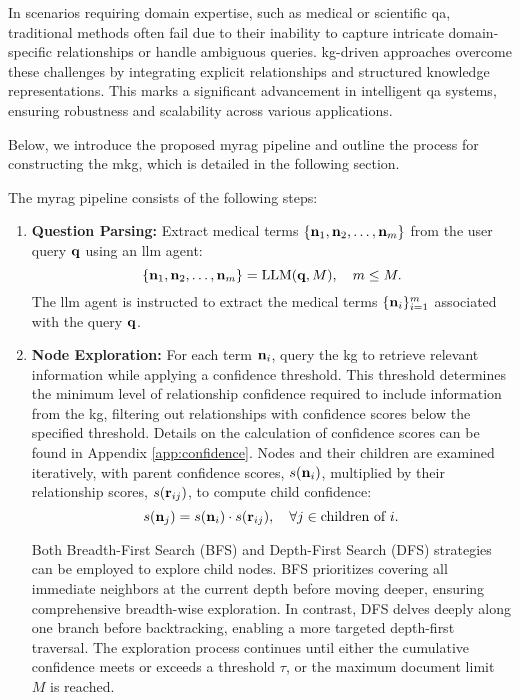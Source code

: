 In scenarios requiring domain expertise, such as medical or scientific \gls{qa}, traditional methods often fail due to their inability to capture intricate domain-specific relationships or handle ambiguous queries. \gls{kg}-driven approaches overcome these challenges by integrating explicit relationships and structured knowledge representations. This marks a significant advancement in intelligent \gls{qa} systems, ensuring robustness and scalability across various applications.


Below, we introduce the proposed \gls{myrag} pipeline and outline the process for constructing the \gls{mkg}, which is detailed in the following section.

The \gls{myrag} pipeline consists of the following steps:
\begin{enumerate}
    \item \textbf{Question Parsing:} Extract medical terms $\{{\mathbf{n}}_1, {\mathbf{n}}_2, \ldots, {\mathbf{n}}_m\}$ from the user query ${\mathbf{q}}$ using an \gls{llm} agent:
    \[
    \{{\mathbf{n}}_1, {\mathbf{n}}_2, \ldots, {\mathbf{n}}_m\} = \text{LLM}({\mathbf{q}}, M), \quad m \leq M.
    \]
    The \gls{llm} agent is instructed to extract the medical terms $\{{\mathbf{n}}_i\}_{i=1}^m$ associated with the query ${\mathbf{q}}$.

    \item \textbf{Node Exploration:} For each term ${\mathbf{n}}_i$, query the \gls{kg} to retrieve relevant information while applying a confidence threshold. This threshold determines the minimum level of relationship confidence required to include information from the \gls{kg}, filtering out relationships with confidence scores below the specified threshold. Details on the calculation of confidence scores can be found in Appendix \ref{app:confidence}. Nodes and their children are examined iteratively, with parent confidence scores, $s({\mathbf{n}}_i)$, multiplied by their relationship scores, $s({\mathbf{r}}_{ij})$, to compute child confidence:
    \[
    s({\mathbf{n}}_j) = s({\mathbf{n}}_i) \cdot s({\mathbf{r}}_{ij}), \quad \forall j \in \text{children of } i.
    \]

    Both Breadth-First Search (BFS) and Depth-First Search (DFS) strategies can be employed to explore child nodes. BFS prioritizes covering all immediate neighbors at the current depth before moving deeper, ensuring comprehensive breadth-wise exploration. In contrast, DFS delves deeply along one branch before backtracking, enabling a more targeted depth-first traversal. The exploration process continues until either the cumulative confidence meets or exceeds a threshold $\tau$, or the maximum document limit $M$ is reached.


\end{enumerate}
